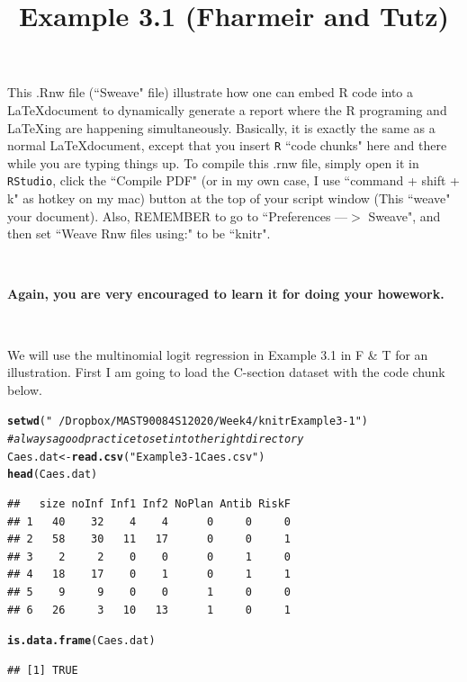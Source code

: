 \documentclass{article}\usepackage[]{graphicx}\usepackage[]{color}
\title{Example 3.1 (Fharmeir and Tutz)}\author{}\date{}
\makeatletter
\newcommand{\hlstr}[1]{\textcolor[rgb]{0.192,0.494,0.8}{#1}}%
\newcommand{\hlcom}[1]{\textcolor[rgb]{0.678,0.584,0.686}{\textit{#1}}}%
\newcommand{\hlstd}[1]{\textcolor[rgb]{0.345,0.345,0.345}{#1}}%
\newcommand{\hlkwb}[1]{\textcolor[rgb]{0.69,0.353,0.396}{#1}}%
\newcommand{\hlkwd}[1]{\textcolor[rgb]{0.737,0.353,0.396}{\textbf{#1}}}%
\newenvironment{kframe}{%
 \def\at@end@of@kframe{}%
 \ifinner\ifhmode%
  \def\at@end@of@kframe{\end{minipage}}%
  \begin{minipage}{\columnwidth}%
 \fi\fi%
 \def\FrameCommand##1{\hskip\@totalleftmargin \hskip-\fboxsep
 \colorbox{shadecolor}{##1}\hskip-\fboxsep
     \hskip-\linewidth \hskip-\@totalleftmargin \hskip\columnwidth}%
 \MakeFramed {\advance\hsize-\width
   \@totalleftmargin\z@ \linewidth\hsize
   \@setminipage}}%
 {\par\unskip\endMakeFramed%
 \at@end@of@kframe}
\newenvironment{knitrout}{}{} %
\makeatother
\begin{document}
\maketitle

\pagestyle{plain}
 
This .Rnw file (``Sweave" file) illustrate how one can embed R code into a \LaTeX document to dynamically generate a report where the R programing and \LaTeX ing are happening simultaneously. Basically, it is exactly the same as a normal \LaTeX document, except that you insert \texttt{R} ``code chunks" here and there while you are typing things up. To compile this .rnw file, simply open it in  \texttt{RStudio}, click the ``Compile PDF" (or in my own case, I use ``command + shift + k" as hotkey on my mac) button at the top of your script window (This ``weave" your document). Also, REMEMBER to go to ``Preferences ---$>$ Sweave", and then set ``Weave Rnw files using:" to be ``knitr". 

\ \

{\bf Again, you are very encouraged to learn it for doing your howework.} 

\ \


We will use the multinomial logit regression in Example 3.1 in F \& T for an illustration. First  I am going to load the C-section dataset with the code chunk below. 

\begin{knitrout}
\color{fgcolor}\begin{kframe}
\begin{alltt}
\hlkwd{setwd}\hlstd{(}\hlstr{"~/Dropbox/MAST 90084 S1 2020/Week 4/knitr Example 3-1"}\hlstd{)}
\hlcom{# always a good practice to set into the right directory}
\hlstd{Caes.dat} \hlkwb{<-} \hlkwd{read.csv}\hlstd{(}\hlstr{"Example3-1Caes.csv"}\hlstd{)}
\hlkwd{head}\hlstd{(Caes.dat)}
\end{alltt}
\begin{verbatim}
##   size noInf Inf1 Inf2 NoPlan Antib RiskF
## 1   40    32    4    4      0     0     0
## 2   58    30   11   17      0     0     1
## 3    2     2    0    0      0     1     0
## 4   18    17    0    1      0     1     1
## 5    9     9    0    0      1     0     0
## 6   26     3   10   13      1     0     1
\end{verbatim}
\begin{alltt}
\hlkwd{is.data.frame}\hlstd{(Caes.dat)}
\end{alltt}
\begin{verbatim}
## [1] TRUE
\end{verbatim}
\end{kframe}
\end{knitrout}
\end{document}
